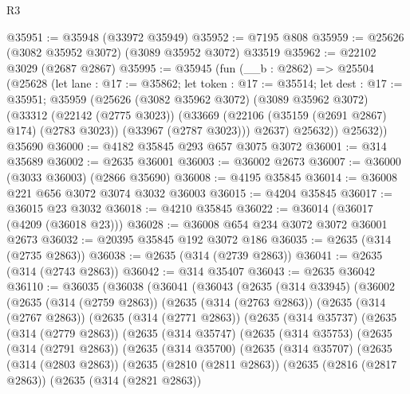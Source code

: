 \begin{lexlean}{R3}
\begin{coremodule}
@35951 := @35948 (@33972 @35949)
@35952 := @7195 @808
@35959 := @25626 (@3082 @35952 @3072) (@3089 @35952 @3072) @33519
@35962 := @22102 @3029 (@2687 @2867)
@35995 := @35945
    (fun (__b : @2862) =>
    @25504
      (@25628
        (let lane : @17 := @35862;
        let token : @17 := @35514;
        let dest : @17 := @35951;
        @35959
          (@25626
            (@3082 @35962 @3072)
            (@3089 @35962 @3072)
            (@33312
              (@22142 (@2775 @3023))
              (@33669 (@22106 (@35159 (@2691 @2867) @174) (@2783 @3023)) (@33967 (@2787 @3023)))
              @2637)
            @25632))
        @25632))
    @35690
@36000 := @4182 @35845 @293 @657 @3075 @3072
@36001 := @314 @35689
@36002 := @2635 @36001
@36003 := @36002 @2673
@36007 := @36000 (@3033 @36003) (@2866 @35690)
@36008 := @4195 @35845
@36014 := @36008 @221 @656 @3072 @3074 @3032 @36003
@36015 := @4204 @35845
@36017 := @36015 @23 @3032
@36018 := @4210 @35845
@36022 := @36014 (@36017 (@4209 (@36018 @23)))
@36028 := @36008 @654 @234 @3072 @3072 @36001 @2673
@36032 := @20395 @35845 @192 @3072 @186
@36035 := @2635 (@314 (@2735 @2863))
@36038 := @2635 (@314 (@2739 @2863))
@36041 := @2635 (@314 (@2743 @2863))
@36042 := @314 @35407
@36043 := @2635 @36042
@36110 := @36035
    (@36038
      (@36041
        (@36043
          (@2635
            (@314 @33945)
            (@36002
              (@2635
                (@314 (@2759 @2863))
                (@2635
                  (@314 (@2763 @2863))
                  (@2635
                    (@314 (@2767 @2863))
                    (@2635
                      (@314 (@2771 @2863))
                      (@2635
                        (@314 @35737)
                        (@2635
                          (@314 (@2779 @2863))
                          (@2635
                            (@314 @35747)
                            (@2635
                              (@314 @35753)
                              (@2635
                                (@314 (@2791 @2863))
                                (@2635
                                  (@314 @35700)
                                  (@2635
                                    (@314 @35707)
                                    (@2635
                                      (@314 (@2803 @2863))
                                      (@2635
                                        (@2810 (@2811 @2863))
                                        (@2635
                                          (@2816 (@2817 @2863))
                                          (@2635
                                            (@314 (@2821 @2863))

\end{coremodule}
\end{lexlean}
